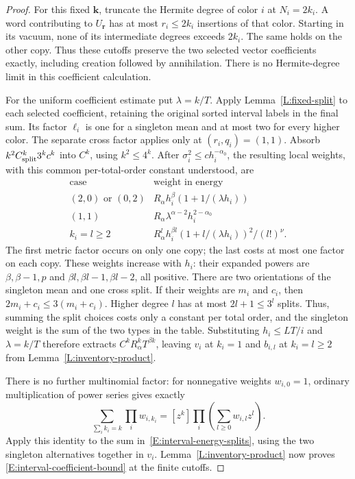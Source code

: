 \documentclass[12pt]{article}
\numberwithin{equation}{section}
\theoremstyle{definition}
\begin{document}
\begin{proof}
  For this fixed $\boldsymbol k$, truncate the Hermite degree of color $i$
  at $N_i=2k_i$. A word contributing to $U_{\boldsymbol r}$ has at most
  $r_i\le2k_i$ insertions of that color. Starting in its vacuum, none of
  its intermediate degrees exceeds $2k_i$. The same holds on the other
  copy. Thus these cutoffs preserve the two selected vector coefficients
  exactly, including creation followed by annihilation. There is no
  Hermite-degree limit in this coefficient calculation.

  For the uniform coefficient estimate put $\lambda=k/T$.
  Apply Lemma~\ref{L:fixed-split} to each selected coefficient, retaining
  the original sorted interval labels in the final sum.
  Its factor $\ell_i$ is one for a singleton mean and at most two for
  every higher color. The separate cross factor applies only at
  $(r_i,q_i)=(1,1)$.
  Absorb $k^2C_{\rm split}^k3^kc^k$ into $C^k$, using $k^2\le4^k$.
  After $\sigma_i^2\le c h_i^{-\alpha_0}$, the resulting local weights,
  with this common per-total-order constant understood, are
  \[
    \begin{array}{c|c}
      \text{case}&\text{weight in energy}\\ \hline
      (2,0)\text{ or }(0,2)&R_\alpha h_i^\beta
      (1+1/(\lambda h_i))\\
      (1,1)&R_\alpha\lambda^{\alpha-2}h_i^{2-\alpha_0}\\
      k_i=l\ge2&R_\alpha^l h_i^{\beta l}
      (1+l/(\lambda h_i))^2/(l!)^\nu .
    \end{array}
  \]
  The first metric factor occurs on only one copy; the last costs at
  most one factor on each copy. These weights increase with $h_i$:
  their expanded powers are $\beta,\beta-1,p$ and
  $\beta l,\beta l-1,\beta l-2$, all positive.
  There are two orientations of the singleton mean and one cross split.
  If their weights are $m_i$ and $c_i$, then
  $2m_i+c_i\le3(m_i+c_i)$.
  Higher degree $l$ has at most $2l+1\le3^l$ splits.
  Thus, summing the split choices costs only a constant per total order,
  and the singleton weight is the sum of the two types in the table.
  Substituting $h_i\le LT/i$ and $\lambda=k/T$ therefore extracts
  $C^kR_\alpha^kT^{\beta k}$, leaving $v_i$ at $k_i=1$ and
  $b_{i,l}$ at $k_i=l\ge2$ from Lemma~\ref{L:inventory-product}.

  There is no further multinomial factor: for nonnegative weights
  $w_{i,0}=1$, ordinary multiplication of power series gives exactly
  \[
    \sum_{\sum_i k_i=k}\prod_i w_{i,k_i}
    =[z^k]\prod_i\left(\sum_{l\ge0}w_{i,l}z^l\right).
  \]
  Apply this identity to the sum in~\eqref{E:interval-energy-splits},
  using the two singleton alternatives together in $v_i$.
  Lemma~\ref{L:inventory-product} now proves
  \eqref{E:interval-coefficient-bound} at the finite cutoffs.


\end{proof}
\end{document}
